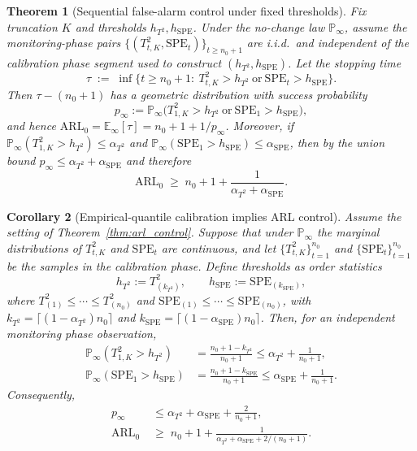 \documentclass{article}
\theoremstyle{plain}
\newtheorem{theorem}{Theorem}[section]
\newtheorem{corollary}[theorem]{Corollary}
\theoremstyle{definition}
\theoremstyle{remark}
\begin{document}
\begin{theorem}[Sequential false-alarm control under fixed thresholds]\label{thm:arl_control_full}
Fix truncation $K$ and thresholds $h_{T^2},h_{\mathrm{SPE}}$.
Under the no-change law $\mathbb P_{\infty}$, assume the monitoring-phase pairs $\{(T_{t,K}^2,\mathrm{SPE}_t)\}_{t\ge n_0+1}$ are i.i.d.\ and independent of the calibration phase segment used to construct $(h_{T^2},h_{\mathrm{SPE}})$.
Let the stopping time
\[
\tau \;:=\; \inf\Big\{t\ge n_0+1:\ T_{t,K}^2>h_{T^2}\ \text{or}\ \mathrm{SPE}_t>h_{\mathrm{SPE}}\Big\}.
\]
Then $\tau-(n_0+1)$ has a geometric distribution with success probability \citep[e.g., the classical run-length calculation for Shewhart-type charts;][]{shewhart1931economic,montgomery2020introduction}
\[
p_{\infty} := \mathbb P_{\infty}\!\Big(T_{1,K}^2>h_{T^2}\ \text{or}\ \mathrm{SPE}_1>h_{\mathrm{SPE}}\Big),
\]
and hence $\mathrm{ARL}_0=\mathbb E_{\infty}[\tau]=n_0+1+1/p_{\infty}$.
Moreover, if $\mathbb P_{\infty}(T_{1,K}^2>h_{T^2})\le \alpha_{T^2}$ and $\mathbb P_{\infty}(\mathrm{SPE}_1>h_{\mathrm{SPE}})\le \alpha_{\mathrm{SPE}}$, then by the union bound $p_{\infty}\le \alpha_{T^2}+\alpha_{\mathrm{SPE}}$ and therefore
\[
\mathrm{ARL}_0 \;\ge\; n_0+1+\frac{1}{\alpha_{T^2}+\alpha_{\mathrm{SPE}}}.
\]
\end{theorem}

\begin{corollary}[Empirical-quantile calibration implies ARL control]\label{cor:arl_empquant2}
Assume the setting of Theorem~\ref{thm:arl_control}.
Suppose that under $\mathbb P_{\infty}$ the marginal distributions of $T_{t,K}^2$ and $\mathrm{SPE}_t$ are continuous, and let $\{T_{t,K}^2\}_{t=1}^{n_0}$ and $\{\mathrm{SPE}_t\}_{t=1}^{n_0}$ be the samples in the calibration phase.
Define thresholds as order statistics
\[
h_{T^2}:=T_{(k_{T^2})}^2,
\qquad
h_{\mathrm{SPE}}:=\mathrm{SPE}_{(k_{\mathrm{SPE}})},
\]
where $T_{(1)}^2\le\cdots\le T_{(n_0)}^2$ and $\mathrm{SPE}_{(1)}\le\cdots\le \mathrm{SPE}_{(n_0)}$, with
$k_{T^2}=\lceil (1-\alpha_{T^2})n_0\rceil$ and $k_{\mathrm{SPE}}=\lceil (1-\alpha_{\mathrm{SPE}})n_0\rceil$.
Then, for an independent monitoring phase observation,
\begin{align*}
  \mathbb P_{\infty}(T_{1,K}^2>h_{T^2})&=\frac{n_0+1-k_{T^2}}{n_0+1}\le \alpha_{T^2}+\frac{1}{n_0+1},\\
\mathbb P_{\infty}(\mathrm{SPE}_1>h_{\mathrm{SPE}})&=\frac{n_0+1-k_{\mathrm{SPE}}}{n_0+1}\le \alpha_{\mathrm{SPE}}+\frac{1}{n_0+1}.
\end{align*}
Consequently,
\begin{align*}
p_{\infty} &\le \alpha_{T^2}+\alpha_{\mathrm{SPE}}+\frac{2}{n_0+1},\\
\mathrm{ARL}_0 \;&\ge\; n_0+1+\frac{1}{\alpha_{T^2}+\alpha_{\mathrm{SPE}}+2/(n_0+1)}.
\end{align*}
\end{corollary}
\end{document}
